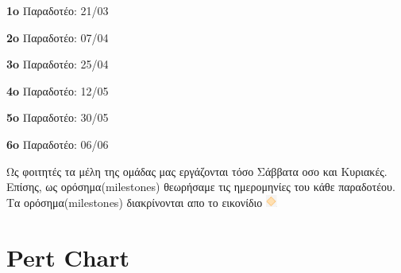 \documentclass[12pt,a4paper,oneside]{article}
\begin{document}
 \centerline {\textbf{1o} Παραδοτέο: 21/03}
 \centerline  {\textbf{2o} Παραδοτέο: 07/04}
 \centerline  {\textbf{3o} Παραδοτέο: 25/04}
 \centerline  {\textbf{4o} Παραδοτέο: 12/05}
 \centerline  {\textbf{5o} Παραδοτέο: 30/05}
 \centerline  {\textbf{6o} Παραδοτέο: 06/06}
 \vspace{2mm}
 Ως φοιτητές τα μέλη της ομάδας μας εργάζονται τόσο Σάββατα οσο και Κυριακές. Επίσης, ως ορόσημα(milestones) θεωρήσαμε τις ημερομηνίες του κάθε παραδοτέου. Τα ορόσημα(milestones) διακρίνονται απο το εικονίδιο \space
   \includegraphics[width=0.027\textwidth]{milestone.png}
 
\begin{center}

    
\end{center}

\section{Pert Chart}\label{sec:lit-rev}
\end{document}
